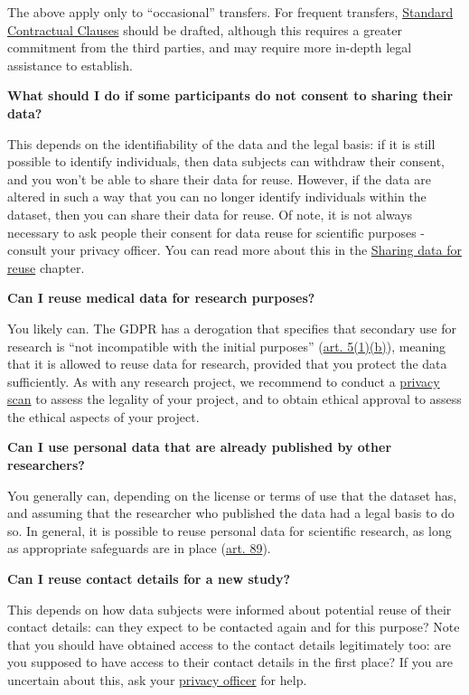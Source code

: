 \documentclass[
]{book}
\begin{document}
The above apply only to ``occasional'' transfers. For frequent transfers, \protect\hyperlink{scc}{Standard Contractual Clauses} should be drafted, although this requires a greater commitment from the third parties, and may require more in-depth legal assistance to establish.

\textbf{What should I do if some participants do not consent to sharing their data?}

This depends on the identifiability of the data and the legal basis: if it is still possible to identify individuals, then data subjects can withdraw their consent, and you won't be able to share their data for reuse. However, if the data are altered in such a way that you can no longer identify individuals within the dataset, then you can share their data for reuse. Of note, it is not always necessary to ask people their consent for data reuse for scientific purposes - consult your privacy officer. You can read more about this in the \protect\hyperlink{data-sharing-reuse}{Sharing data for reuse} chapter.

\textbf{Can I reuse medical data for research purposes?}

You likely can. The GDPR has a derogation that specifies that secondary use for research is ``not incompatible with the initial purposes'' (\href{https://gdpr-info.eu/art-5-gdpr/}{art. 5(1)(b)}), meaning that it is allowed to reuse data for research, provided that you protect the data sufficiently. As with any research project, we recommend to conduct a \protect\hyperlink{privacy-scan}{privacy scan} to assess the legality of your project, and to obtain ethical approval to assess the ethical aspects of your project.

\textbf{Can I use personal data that are already published by other researchers?}

You generally can, depending on the license or terms of use that the dataset has, and assuming that the researcher who published the data had a legal basis to do so. In general, it is possible to reuse personal data for scientific research, as long as appropriate safeguards are in place (\href{https://gdpr-info.eu/art-89-gdpr/}{art. 89}).

\textbf{Can I reuse contact details for a new study?}

This depends on how data subjects were informed about potential reuse of their contact details: can they expect to be contacted again and for this purpose? Note that you should have obtained access to the contact details legitimately too: are you supposed to have access to their contact details in the first place? If you are uncertain about this, ask your \protect\hyperlink{support}{privacy officer} for help.
\end{document}
